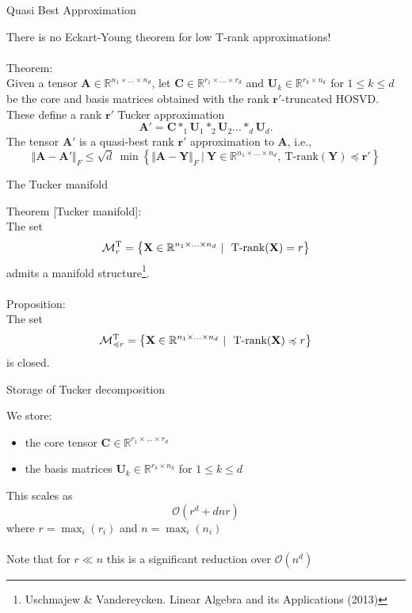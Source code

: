\documentclass{beamer}
\newcommand{\bvec}[1]{\mathbf{#1}}
\newcommand{\vr}{\bvec{r}}
\newcommand{\vA}{\bvec{A}}
\newcommand{\vC}{\bvec{C}}
\newcommand{\vU}{\bvec{U}}
\newcommand{\vX}{\bvec{X}}
\newcommand{\vY}{\bvec{Y}}
\newcommand{\bitem}{\item[$\bullet$]}
\begin{document}
\begin{frame}{ Quasi Best Approximation}

There is no Eckart-Young theorem for low T-rank approximations!\\
~\\
Theorem:\\
Given a tensor $\vA \in \mathbb{R}^{n_1\times ... \times n_d}$, let $\vC\in \mathbb{R}^{r_1\times ... \times r_d}$ and $\vU_k\in \mathbb{R}^{r_k\times n_k}$ for $1\leq k \leq d$ be the core and basis matrices obtained with the rank $\vr'$-truncated HOSVD. These define a rank $\vr'$ Tucker approximation
$$
\vA' = \vC *_{1} \vU_1 *_{2} \vU_2 ... *_{d} \vU_d.
$$
The tensor $\vA'$ is a quasi-best rank $\vr'$ approximation to $\vA$, i.e., 
$$
\Vert 
\vA - \vA'
\Vert_F
\leq 
\sqrt{d}~
\min
\left\lbrace
\Vert \vA - \vY \Vert_F~|~ \vY \in \mathbb{R}^{n_1\times ... \times n_d},~ \text{T-rank}(\vY) \preccurlyeq \vr'
\right\rbrace
$$

\end{frame}


\begin{frame}{The Tucker manifold}

Theorem [Tucker manifold]:\\
The set 
\begin{equation*}
\mathcal{M}_{r}^{\rm T}
=
\left\lbrace
\vX \in \mathbb{R}^{n_1 \times ... \times n_d}~|~
\text{ T-rank} (\vX) = r
\right\rbrace
\end{equation*}
admits a manifold structure\footnote{Uschmajew \& Vandereycken. Linear Algebra and its Applications (2013)}.\\
~\\
\pause
Proposition:\\
The set
\begin{equation*}
\mathcal{M}_{\preccurlyeq r}^{\rm T}
=
\left\lbrace
\vX \in \mathbb{R}^{n_1 \times ... \times n_d}~|~
\text{ T-rank} (\vX) \preccurlyeq r
\right\rbrace
\end{equation*}
is closed.
\end{frame}

\begin{frame}{Storage of Tucker decomposition}

We store:
\begin{itemize}
    \bitem the core tensor $\vC \in \mathbb{R}^{r_1\times ... \times r_d}$  
    \bitem the basis matrices $\vU_k \in \mathbb{R}^{r_k \times n_k}$ for $1\leq k \leq d$
\end{itemize}

This scales as  
$$
\mathcal{O}(r^d + d nr) 
$$
where $r = \max_i(r_i)$ and $n = \max_i (n_i)$\\
~\\
Note that for $r \ll n$ this is a significant reduction over $\mathcal{O}(n^d)$

\end{frame}
\end{document}
